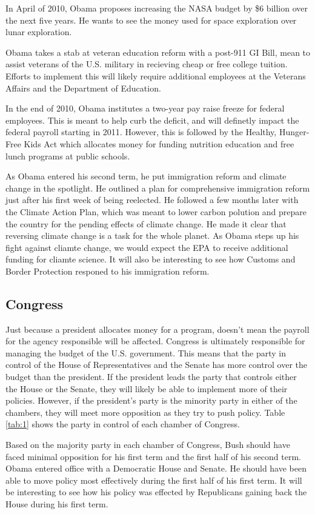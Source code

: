 \documentclass{article}
\begin{document}
        \par
        In April of 2010, Obama proposes increasing the NASA budget by \$6 billion over the next five years. He wants to see the money used for space exploration over lunar exploration.\cite{obamaevents}
        \par
        Obama takes a stab at veteran education reform with a post-911 GI Bill, mean to assist veterans of the U.S. military in recieving cheap or free college tuition.\cite{obamaevents} Efforts to implement this will likely require additional employees at the Veterans Affairs and the Department of Education.
        \par
        In the end of 2010, Obama institutes a two-year pay raise freeze for federal employees. This is meant to help curb the deficit, and will definetly impact the federal payroll starting in 2011. However, this is followed by the Healthy, Hunger-Free Kids Act which allocates money for funding nutrition education and free lunch programs at public schools.
        \par
        As Obama entered his second term, he put immigration reform and climate change in the spotlight. He outlined a plan for comprehensive immigration reform just after his first week of being reelected. He followed a few months later with the Climate Action Plan, which was meant to lower carbon polution and prepare the country for the pending effects of climate change. He made it clear that reversing climate change is a task for the whole planet.\cite{obamaevents} As Obama steps up his fight against cliamte change, we would expect the EPA to receive additional funding for cliamte science. It will also be interesting to see how Customs and Border Protection responed to his immigration reform.

    \subsection{Congress}
    Just because a president allocates money for a program, doesn't mean the payroll for the agency responsible will be affected. Congress is ultimately responsible for managing the budget of the U.S. government. This means that the party in control of the House of Representatives and the Senate has more control over the budget than the president. If the president leads the party that controls either the House or the Senate, they will likely be able to implement more of their policies. However, if the president's party is the minority party in either of the chambers, they will meet more opposition as they try to push policy. Table \ref{tab:1} shows the party in control of each chamber of Congress.
    \par
    Based on the majority party in each chamber of Congress, Bush should have faced minimal opposition for his first term and the first half of his second term. Obama entered office with a Democratic House and Senate. He should have been able to move policy most effectively during the first half of his first term. It will be interesting to see how his policy was effected by Republicans gaining back the House during his first term.
\end{document}
